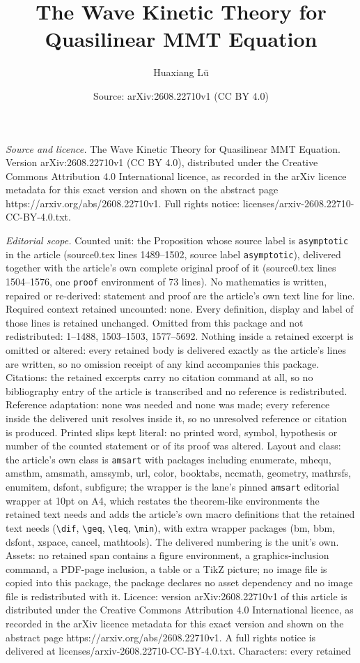 \documentclass[10pt,a4paper]{amsart}
\title[The Wave Kinetic Theory for Quasilinear MMT Equation]{The Wave Kinetic Theory for Quasilinear MMT Equation}
\author{Huaxiang L\"u}
\date{Source: arXiv:2608.22710v1 (CC BY 4.0)}
\begin{document}
\maketitle

\noindent\emph{Source and licence.} The Wave Kinetic Theory for Quasilinear MMT Equation. Version arXiv:2608.22710v1 (CC BY 4.0), distributed under the Creative Commons Attribution 4.0 International licence, as recorded in the arXiv licence metadata for this exact version and shown on the abstract page https://arxiv.org/abs/2608.22710v1. Full rights notice: licenses/arxiv-2608.22710-CC-BY-4.0.txt.\par\smallskip

\noindent\textit{Editorial scope.} Counted unit: the Proposition whose source label is \texttt{asymptotic} in the article (source0.tex lines 1489--1502, source label \texttt{asymptotic}), delivered together with the article's own complete original proof of it (source0.tex lines 1504--1576, one \texttt{proof} environment of 73 lines). No mathematics is written, repaired or re-derived: statement and proof are the article's own text line for line. Required context retained uncounted: none. Every definition, display and label of those lines is retained unchanged. Omitted from this package and not redistributed: 1--1488, 1503--1503, 1577--5692. Nothing inside a retained excerpt is omitted or altered: every retained body is delivered exactly as the article's lines are written, so no omission receipt of any kind accompanies this package. Citations: the retained excerpts carry no citation command at all, so no bibliography entry of the article is transcribed and no reference is redistributed. Reference adaptation: none was needed and none was made; every reference inside the delivered unit resolves inside it, so no unresolved reference or citation is produced. Printed slips kept literal: no printed word, symbol, hypothesis or number of the counted statement or of its proof was altered. Layout and class: the article's own class is \texttt{amsart} with packages including enumerate, mhequ, amsthm, amsmath, amssymb, url, color, booktabs, nccmath, geometry, mathrsfs, enumitem, dsfont, subfigure; the wrapper is the lane's pinned \texttt{amsart} editorial wrapper at 10pt on A4, which restates the theorem-like environments the retained text needs and adds the article's own macro definitions that the retained text needs (\texttt{\textbackslash dif}, \texttt{\textbackslash geq}, \texttt{\textbackslash leq}, \texttt{\textbackslash min}), with extra wrapper packages (bm, bbm, dsfont, xspace, cancel, mathtools). The delivered numbering is the unit's own. Assets: no retained span contains a figure environment, a graphics-inclusion command, a PDF-page inclusion, a table or a TikZ picture; no image file is copied into this package, the package declares no asset dependency and no image file is redistributed with it. Licence: version arXiv:2608.22710v1 of this article is distributed under the Creative Commons Attribution 4.0 International licence, as recorded in the arXiv licence metadata for this exact version and shown on the abstract page https://arxiv.org/abs/2608.22710v1. A full rights notice is delivered at licenses/arxiv-2608.22710-CC-BY-4.0.txt. Characters: every retained 
\end{document}

